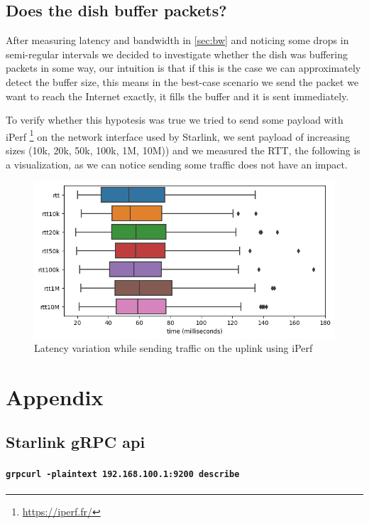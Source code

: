 \documentclass[IN,11pt,twoside,openright,bachelor,english]{tumthesis}
\begin{document}
\section{Does the dish buffer packets?}

After measuring latency and bandwidth in \ref{sec:bw} and noticing some drops in semi-regular intervals we decided to investigate whether the dish was buffering packets in some way, our intuition is that if this is the case we can approximately detect the buffer size, this means in the best-case scenario we send the packet we want to reach the Internet exactly, it fills the buffer and it is sent immediately.

To verify whether this hypotesis was true we tried to send some payload with iPerf \footnote{\url{https://iperf.fr/}} on the network interface used by Starlink, we sent payload of increasing sizes (10k, 20k, 50k, 100k, 1M, 10M)) and we measured the RTT, the following is a visualization, as we can notice sending some traffic does not have an impact.

\begin{figure}
	\centering
	\includegraphics[width=0.6\columnwidth]{img/latency_iperf.png}
	\caption{Latency variation while sending traffic on the uplink using iPerf}
\end{figure}

\appendix
\chapter{Appendix}
\label{chap:appendix}


\section{Starlink gRPC api}
\label{starlink-grpc}

\subsubsection{\texttt{grpcurl -plaintext 192.168.100.1:9200 describe}}
\end{document}
